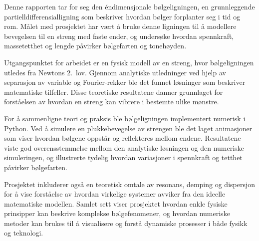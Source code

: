 Denne rapporten tar for seg den éndimensjonale bølgeligningen, en grunnleggende partielldifferensialligning som beskriver hvordan bølger forplanter seg i tid og rom. 
Målet med prosjektet har vært å bruke denne ligningen til å modellere bevegelsen til en streng med faste ender, og undersøke hvordan spennkraft, massetetthet og lengde påvirker bølgefarten og tonehøyden.

Utgangspunktet for arbeidet er en fysisk modell av en streng, hvor bølgeligningen utledes fra Newtons 2.~lov. 
Gjennom analytiske utledninger ved hjelp av separasjon av variable og Fourier-rekker ble det funnet løsninger som beskriver matematiske tilfeller. 
Disse teoretiske resultatene danner grunnlaget for forståelsen av hvordan en streng kan vibrere i bestemte ulike mønstre.

For å sammenligne teori og praksis ble bølgeligningen implementert numerisk i Python. 
Ved å simulere en plukkebevegelse av strengen ble det laget animasjoner som viser hvordan bølgene oppstår og reflekteres mellom endene. 
Resultatene viste god overensstemmelse mellom den analytiske løsningen og den numeriske simuleringen, og illustrerte tydelig hvordan variasjoner i spennkraft og tetthet påvirker bølgefarten.  

Prosjektet inkluderer også en teoretisk omtale av resonans, demping og dispersjon for å vise forståelse av hvordan virkelige systemer avviker fra den ideelle matematiske modellen. 
Samlet sett viser prosjektet hvordan enkle fysiske prinsipper kan beskrive komplekse bølgefenomener, og hvordan numeriske metoder kan brukes til å visualisere og forstå dynamiske prosesser i både fysikk og teknologi.
